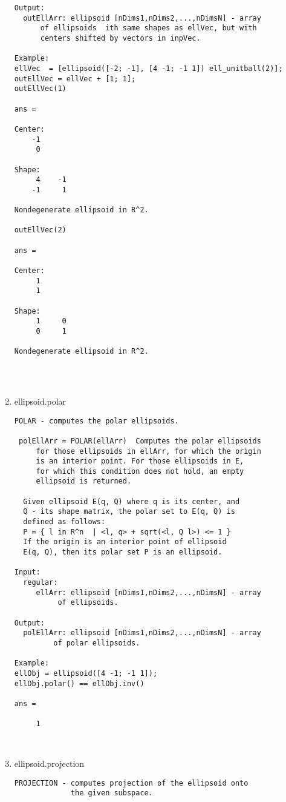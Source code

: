 \begin{enumerate}
\begin{lstlisting}
Output:
  outEllArr: ellipsoid [nDims1,nDims2,...,nDimsN] - array
      of ellipsoids  ith same shapes as ellVec, but with
      centers shifted by vectors in inpVec.

Example:
ellVec  = [ellipsoid([-2; -1], [4 -1; -1 1]) ell_unitball(2)];
outEllVec = ellVec + [1; 1];
outEllVec(1)

ans =

Center:
    -1
     0

Shape:
     4    -1
    -1     1

Nondegenerate ellipsoid in R^2.

outEllVec(2)

ans =

Center:
     1
     1

Shape:
     1     0
     0     1

Nondegenerate ellipsoid in R^2.




\end{lstlisting}
\fontfamily{\familydefault}
\selectfont
\item {ellipsoid.polar}
\selectfont
\begin{lstlisting}
POLAR - computes the polar ellipsoids.

 polEllArr = POLAR(ellArr)  Computes the polar ellipsoids
     for those ellipsoids in ellArr, for which the origin
     is an interior point. For those ellipsoids in E,
     for which this condition does not hold, an empty
     ellipsoid is returned.

  Given ellipsoid E(q, Q) where q is its center, and
  Q - its shape matrix, the polar set to E(q, Q) is
  defined as follows:
  P = { l in R^n  | <l, q> + sqrt(<l, Q l>) <= 1 }
  If the origin is an interior point of ellipsoid
  E(q, Q), then its polar set P is an ellipsoid.

Input:
  regular:
     ellArr: ellipsoid [nDims1,nDims2,...,nDimsN] - array
          of ellipsoids.

Output:
  polEllArr: ellipsoid [nDims1,nDims2,...,nDimsN] - array
         of polar ellipsoids.

Example:
ellObj = ellipsoid([4 -1; -1 1]);
ellObj.polar() == ellObj.inv()

ans =

     1



\end{lstlisting}
\fontfamily{\familydefault}
\selectfont
\item {ellipsoid.projection}
\selectfont
\begin{lstlisting}
PROJECTION - computes projection of the ellipsoid onto
             the given subspace.


\end{lstlisting}
\end{enumerate}
